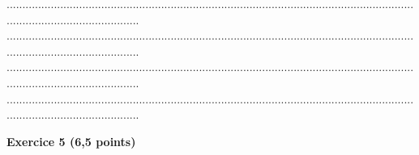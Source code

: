 \documentclass{article}
\begin{document}
\begin{footnotesize}
\begin{enumerate}
\begin{enumerate}
        ...........................................................................................................................................................................\newline
        ...........................................................................................................................................................................\newline
        ...........................................................................................................................................................................\newline
        ...........................................................................................................................................................................
    \end{enumerate}
\end{enumerate}\newpage
\end{footnotesize}
\noindent\textbf{Exercice 5 (6,5 points)}\newline
\end{document}
